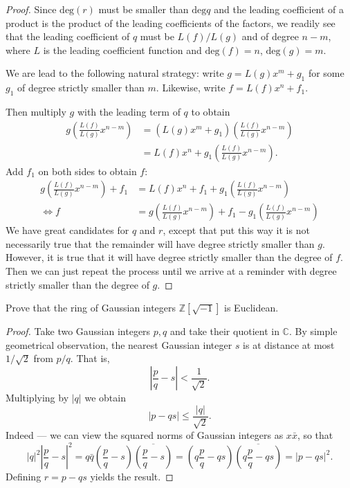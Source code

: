 \begin{proof}
Since $\text{deg}(r)$ must be smaller than
$\text{deg}q$
and the leading coefficient of a product is
the
product of the leading coefficients of the
factors,
we readily see that the leading coefficient
of $q$ must
be $L(f)/L(g)$ and of degree $n-m$, where $L$
is the leading
coefficient function and $\text{deg}(f)=n$,
$\text{deg}(g)=m$.

We are lead to the following natural
strategy:
write $g=L(g)x^m+g_1$ for some $g_1$ of
degree
strictly smaller than $m$. Likewise, write
$f=L(f)x^n+f_1$.

Then multiply $g$ with the leading term of
$q$ to obtain
$$
\begin{aligned}
g
\left(\frac{L(f)}{L(g)}x^{n-m}\right)&=(L(g)
x^m+g_1)
\left(\frac{L(f)}{L(g)}x^{n-m}\right)\\
&=L(f)x^n+g_1\left(\frac{L(f)}{L(g)}x^{n-m}
\right).
\end{aligned}
$$
Add $f_1$ on both sides to obtain $f$:
$$
\begin{aligned}
g\left(\frac{L(f)}{L(g)}x^{n-m}\right)+f_1&=
L(f)x^n+f_1+
g_1\left(\frac{L(f)}{L(g)}x^{n-m}\right)\\
\iff
f&=g\left(\frac{L(f)}{L(g)}x^{n-m}\right)+f_1
-g_1\left(\frac{L(f)}{L(g)}x^{n-m}\right)
\end{aligned}
$$
We have great candidates for $q$ and $r$,
except that put this way
it is not necessarily true that the remainder
will have degree
strictly smaller than $g$. However, it is
true that it
will have degree strictly smaller than the
degree of $f$.
Then we can just repeat
the process until we arrive at a reminder
with degree
strictly smaller than the degree of $g$.
\end{proof}

\begin{exercise}
\label{exercise-gaussian-%
integers-euclidean}
Prove that the ring of Gaussian integers
$\mathbb{Z}[\sqrt{-1}]$ is Euclidean.
\end{exercise}

\begin{proof}
Take two Gaussian integers $p,q$ and
take their quotient in $\mathbb{C}$.
By simple geometrical observation,
the nearest Gaussian integer $s$
is at distance at most $1/\sqrt{2}$
from $p/q$. That is,
$$
\left|\frac{p}{q}-s\right|<\frac{1}{\sqrt{2}}
.
$$
Multiplying by $|q|$ we obtain
$$
|p-qs|\leq \frac{|q|}{\sqrt{2}}.
$$
Indeed --- we can view the squared norms
of Gaussian integers as $x \bar{x}$, so that
$$
|q|^2\left|\frac{p}{q}-s\right|^2
=q\bar{q}\left(
\frac{p}{q}-s\right)
\overline{\left(\frac{p}{q}-s\right)}
=\left(q\frac{p}{q}-qs\right)
\overline{\left(q\frac{p}{q}-qs\right)}
=|p-qs|^2.
$$
Defining $r=p-qs$ yields the result.
\end{proof}

